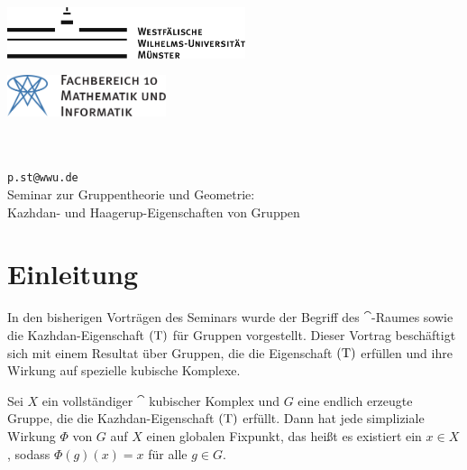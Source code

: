 \thispagestyle{empty}
\begin{center}
\begin{minipage}{0.4\textwidth}
\begin{flushleft}
\includegraphics[height=1.5cm,keepaspectratio]{../img/wwulogo.pdf}
\end{flushleft}
\end{minipage}
\hfill
\begin{minipage}{0.4\textwidth}
\begin{flushright}
\vspace*{0.3cm}
\includegraphics[height=1.2cm,keepaspectratio]{../img/fb10logo.pdf} \
\end{flushright}
\end{minipage}

\vspace*{2cm}
\textbf{\LARGE \vortrag} \\
\vspace{0.6cm}
{\LARGE \verfasser} \\
{\normalsize \texttt{p.st@wwu.de}} \\
\vspace{0.6cm} 
{\Large Seminar zur Gruppentheorie und Geometrie: \\ Kazhdan- und Haagerup-Eigenschaften von Gruppen} \\
\vspace{0.6cm}
\Large{\semester}
\end{center}

\section*{Einleitung}
	In den bisherigen Vorträgen des Seminars wurde der Begriff des $\cat$-Raumes sowie die Kazhdan-Eigenschaft $\operatorname{(T)}$ für Gruppen vorgestellt. Dieser Vortrag beschäftigt sich mit einem Resultat über Gruppen, die die Eigenschaft $\operatorname{(T)}$ erfüllen und ihre Wirkung auf spezielle kubische Komplexe. 
	
\begin{satz2}
	Sei $X$ ein vollständiger $\cat$ kubischer Komplex und $G$ eine endlich erzeugte Gruppe, die die Kazhdan-Eigenschaft $\operatorname{(T)}$ erfüllt. Dann hat jede simpliziale Wirkung $\Phi$ von $G$ auf $X$ einen globalen Fixpunkt, das heißt es existiert ein $x \in X$, sodass $\Phi(g)(x) = x$ für alle $g \in G$.
\end{satz2}